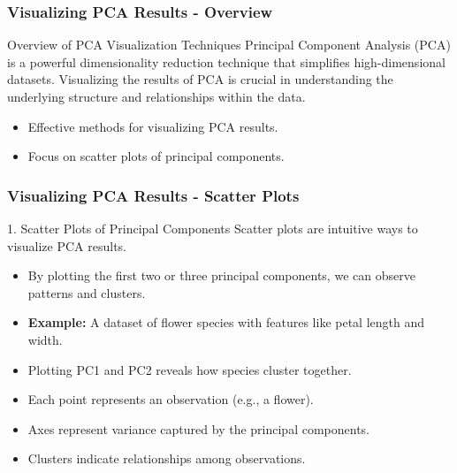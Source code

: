 \documentclass[aspectratio=169]{beamer}
\begin{document}
\begin{frame}[fragile]
    \frametitle{Visualizing PCA Results - Overview}
    \begin{block}{Overview of PCA Visualization Techniques}
        Principal Component Analysis (PCA) is a powerful dimensionality reduction technique that simplifies high-dimensional datasets.
        Visualizing the results of PCA is crucial in understanding the underlying structure and relationships within the data.  
    \end{block}
    \begin{itemize}
        \item Effective methods for visualizing PCA results.
        \item Focus on scatter plots of principal components.
    \end{itemize}
\end{frame}

\begin{frame}[fragile]
    \frametitle{Visualizing PCA Results - Scatter Plots}
    \begin{block}{1. Scatter Plots of Principal Components}
        Scatter plots are intuitive ways to visualize PCA results.
        \begin{itemize}
            \item By plotting the first two or three principal components, we can observe patterns and clusters.
            \item \textbf{Example:} A dataset of flower species with features like petal length and width.
            \item Plotting PC1 and PC2 reveals how species cluster together.
        \end{itemize}
    \end{block}
    \begin{itemize}
        \item Each point represents an observation (e.g., a flower).
        \item Axes represent variance captured by the principal components.
        \item Clusters indicate relationships among observations.
    \end{itemize}
\end{frame}
\end{document}
